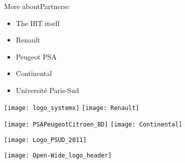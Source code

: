 \documentclass[english,slidetop,9pt,aspectratio=169]{beamer}
\begin{document}
  \begin{myframe}[2]{More about}{Partners}{c}
    \begin{minipage}{0.3\textwidth}
      \begin{itemize}
        \item The IRT itself
        \item Renault
        \item Peugeot PSA
        \item Continental
        \item Universit\'{e} Paris-Sud
      \end{itemize}
    \end{minipage}
    \begin{minipage}{0.65\textwidth}
      \begin{center}
        \texttt{[image: logo\_systemx]}
        \hspace{2pt}
        \texttt{[image: Renault]}
        \vspace{2pt}
        \begin{minipage}{0.5\textwidth}
          \begin{center}
            \texttt{[image: PSAPeugeotCitroen\_BD]}
            \vspace{2pt}
            \texttt{[image: Continental]}
          \end{center}
        \end{minipage}
        \hspace{2pt}
        \begin{minipage}{0.22\textwidth}
          \begin{center}
            \texttt{[image: Logo\_PSUD\_2011]}
          \end{center}
        \end{minipage}
        \vspace{2pt}
        \texttt{[image: Open-Wide\_logo\_header]}
      \end{center}
    \end{minipage}
  \end{myframe}
\end{document}
